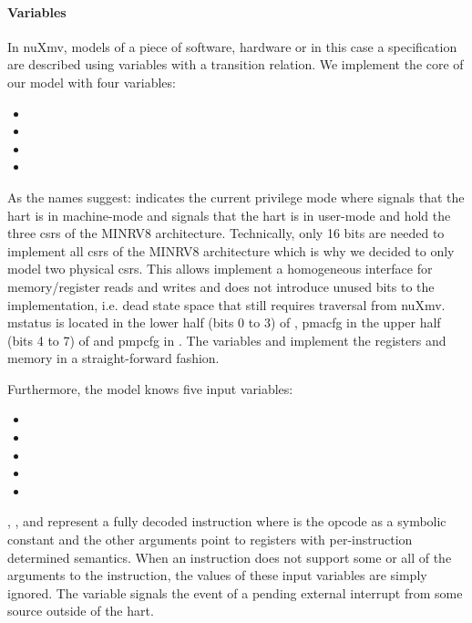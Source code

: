 \paragraph{Variables}
In nuXmv, models of a piece of software, hardware or in this case a specification are described using variables with a transition relation.
We implement the core of our model with four variables:
\begin{itemize}
    \item {}
    \item {}
    \item {}
    \item {}
\end{itemize}

As the names suggest:  indicates the current privilege mode where  signals that the \gls{hart} is in machine-mode and  signals that the \gls{hart} is in user-mode and  hold the three \glspl{csr} of the MINRV8 architecture.
Technically, only 16 bits are needed to implement all \glspl{csr} of the MINRV8 architecture which is why we decided to only model two physical \glspl{csr}.
This allows implement a homogeneous interface for memory/register reads and writes and does not introduce unused bits to the implementation, i.e. dead state space that still requires traversal from nuXmv.
\gls{mstatus} is located in the lower half (bits 0 to 3) of , \gls{pmacfg} in the upper half (bits 4 to 7) of  and \gls{pmpcfg} in .
The variables  and  implement the registers and memory in a straight-forward fashion.

Furthermore, the model knows five input variables:
\begin{itemize}
    \item {}
    \item {}
    \item {}
    \item {}
    \item {}
\end{itemize}

, ,  and  represent a fully decoded instruction where  is the opcode as a symbolic constant and the other arguments point to registers with per-instruction determined semantics.
When an instruction does not support some or all of the arguments to the instruction, the values of these input variables are simply ignored.
The variable  signals the event of a pending external interrupt from some source outside of the \gls{hart}.

